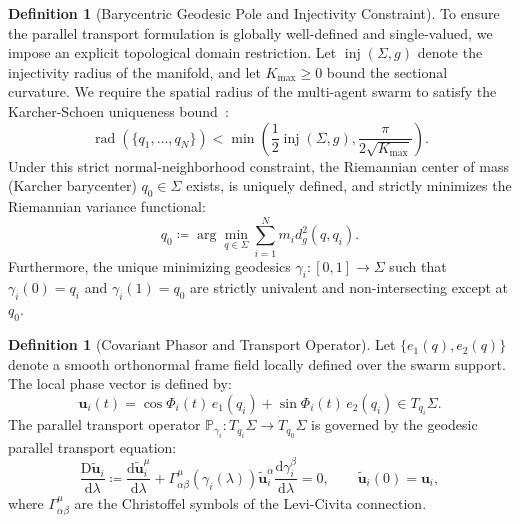 \documentclass[11pt,a4paper,reqno]{article}
\theoremstyle{plain}
\theoremstyle{definition}
\newtheorem{definition}[theorem]{Definition}
\theoremstyle{remark}
\numberwithin{equation}{section}
\begin{document}
\begin{definition}[Barycentric Geodesic Pole and Injectivity Constraint]
\label{def:barycenter}
To ensure the parallel transport formulation is globally well-defined and single-valued, we impose an explicit topological domain restriction. Let $\operatorname{inj}(\Sigma, g)$ denote the injectivity radius of the manifold, and let $K_{\max} \ge 0$ bound the sectional curvature. We require the spatial radius of the multi-agent swarm to satisfy the Karcher-Schoen uniqueness bound~\cite{Karcher1977}:
\begin{equation}
\operatorname{rad}(\{q_1, \dots, q_N\}) < \min\left( \frac{1}{2} \operatorname{inj}(\Sigma, g), \frac{\pi}{2\sqrt{K_{\max}}} \right).
\end{equation}
Under this strict normal-neighborhood constraint, the Riemannian center of mass (Karcher barycenter) $q_0 \in \Sigma$ exists, is uniquely defined, and strictly minimizes the Riemannian variance functional:
\begin{equation}
q_0 \coloneqq \arg\min_{q \in \Sigma} \sum_{i=1}^N m_i d_g^2(q, q_i).
\label{eq:karcher_barycenter}
\end{equation}
Furthermore, the unique minimizing geodesics $\gamma_i: [0, 1] \to \Sigma$ such that $\gamma_i(0) = q_i$ and $\gamma_i(1) = q_0$ are strictly univalent and non-intersecting except at $q_0$.
\end{definition}

\begin{definition}[Covariant Phasor and Transport Operator]
Let $\{e_1(q), e_2(q)\}$ denote a smooth orthonormal frame field locally defined over the swarm support. The local phase vector is defined by:
\begin{equation}
\bm{u}_i(t) = \cos \Phi_i(t) \, e_1(q_i) + \sin \Phi_i(t) \, e_2(q_i) \in T_{q_i}\Sigma.
\end{equation}
The parallel transport operator $\mathbb{P}_{\gamma_i}: T_{q_i}\Sigma \to T_{q_0}\Sigma$ is governed by the geodesic parallel transport equation:
\begin{equation}
\frac{\mathrm{D} \widetilde{\bm{u}}_i}{\mathrm{d}\lambda} \coloneqq \frac{\mathrm{d} \widetilde{\bm{u}}_i^\mu}{\mathrm{d}\lambda} + \Gamma^\mu_{\alpha\beta}(\gamma_i(\lambda)) \widetilde{\bm{u}}_i^\alpha \frac{\mathrm{d}\gamma_i^\beta}{\mathrm{d}\lambda} = 0, \qquad \widetilde{\bm{u}}_i(0) = \bm{u}_i,
\label{eq:parallel_transport}
\end{equation}
where $\Gamma^\mu_{\alpha\beta}$ are the Christoffel symbols of the Levi-Civita connection.
\end{definition}
\end{document}
